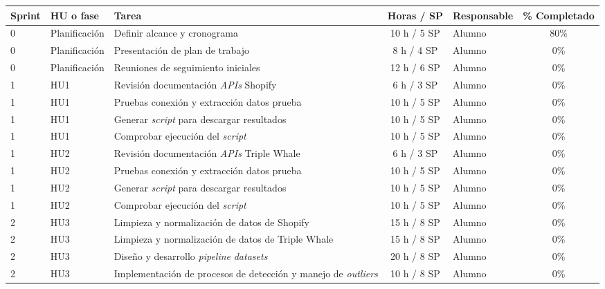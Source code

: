 \documentclass[
11pt, %
]{charter}
\begin{document}
\begin{table}[htpb]
\centering
\begin{tabularx}{\linewidth}{@{}|l|l|X|c|l|c|@{}}
\hline
\rowcolor[HTML]{C0C0C0}
Sprint & HU o fase & Tarea & Horas / SP & Responsable & \% Completado \\ \hline
0 & Planificación & Definir alcance y cronograma & 10 h / 5 SP & Alumno & 80\% \\ \hline
0 & Planificación & Presentación de plan de trabajo & 8 h / 4 SP & Alumno & 0\% \\ \hline
0 & Planificación & Reuniones de seguimiento iniciales & 12 h / 6 SP & Alumno & 0\% \\ \hline

1 & HU1 & Revisión documentación \textit{APIs} Shopify & 6 h / 3 SP & Alumno & 0\% \\ \hline
1 & HU1 & Pruebas conexión y extracción datos prueba & 10 h / 5 SP & Alumno & 0\% \\ \hline
1 & HU1 & Generar \textit{script} para descargar resultados & 10 h / 5 SP & Alumno & 0\% \\ \hline
1 & HU1 & Comprobar ejecución del \textit{script} & 10 h / 5 SP & Alumno & 0\% \\ \hline

1 & HU2 & Revisión documentación \textit{APIs} Triple Whale & 6 h / 3 SP & Alumno & 0\% \\ \hline
1 & HU2 & Pruebas conexión y extracción datos prueba & 10 h / 5 SP & Alumno & 0\% \\ \hline
1 & HU2 & Generar \textit{script} para descargar resultados & 10 h / 5 SP & Alumno & 0\% \\ \hline
1 & HU2 & Comprobar ejecución del \textit{script} & 10 h / 5 SP & Alumno & 0\% \\ \hline

2 & HU3 & Limpieza y normalización de datos de Shopify & 15 h / 8 SP & Alumno & 0\% \\ \hline
2 & HU3 & Limpieza y normalización de datos de Triple Whale & 15 h / 8 SP & Alumno & 0\% \\ \hline
2 & HU3 & Diseño y desarrollo \textit{pipeline} \textit{datasets} & 20 h / 8 SP & Alumno & 0\% \\ \hline
2 & HU3 & Implementación de procesos de detección y manejo de \textit{outliers} & 10 h / 8 SP & Alumno & 0\% \\ \hline

\end{tabularx}
\end{table}
\end{document}
